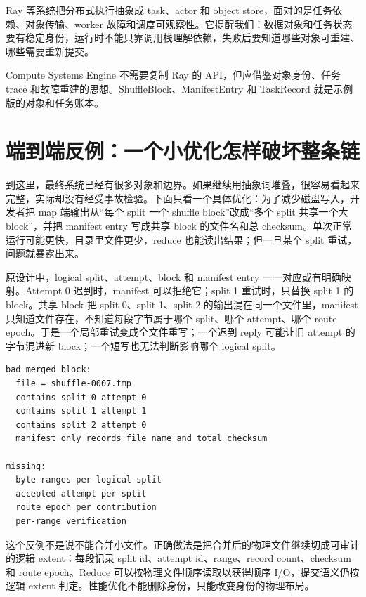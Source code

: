 \begin{casebox}
Ray 等系统把分布式执行抽象成 task、actor 和 object store，面对的是任务依赖、对象传输、worker 故障和调度可观察性。它提醒我们：数据对象和任务状态要有稳定身份，运行时不能只靠调用栈理解依赖，失败后要知道哪些对象可重建、哪些需要重新提交。

Compute Systems Engine 不需要复制 Ray 的 API，但应借鉴对象身份、任务 trace 和故障重建的思想。ShuffleBlock、ManifestEntry 和 TaskRecord 就是示例版的对象和任务账本。
\end{casebox}

\section{端到端反例：一个小优化怎样破坏整条链}

到这里，最终系统已经有很多对象和边界。如果继续用抽象词堆叠，很容易看起来完整，实际却没有经受事故检验。下面只看一个具体优化：为了减少磁盘写入，开发者把 map 端输出从“每个 split 一个 shuffle block”改成“多个 split 共享一个大 block”，并把 manifest entry 写成共享 block 的文件名和总 checksum。单次正常运行可能更快，目录里文件更少，reduce 也能读出结果；但一旦某个 split 重试，问题就暴露出来。

原设计中，logical split、attempt、block 和 manifest entry 一一对应或有明确映射。Attempt 0 迟到时，manifest 可以拒绝它；split 1 重试时，只替换 split 1 的 block。共享 block 把 split 0、split 1、split 2 的输出混在同一个文件里，manifest 只知道文件存在，不知道每段字节属于哪个 split、哪个 attempt、哪个 route epoch。于是一个局部重试变成全文件重写；一个迟到 reply 可能让旧 attempt 的字节混进新 block；一个短写也无法判断影响哪个 logical split。

\begin{lstlisting}[numbers=none,caption={错误优化后的模糊身份}]
bad merged block:
  file = shuffle-0007.tmp
  contains split 0 attempt 0
  contains split 1 attempt 1
  contains split 2 attempt 0
  manifest only records file name and total checksum

missing:
  byte ranges per logical split
  accepted attempt per split
  route epoch per contribution
  per-range verification
\end{lstlisting}

这个反例不是说不能合并小文件。正确做法是把合并后的物理文件继续切成可审计的逻辑 extent：每段记录 split id、attempt id、range、record count、checksum 和 route epoch。Reduce 可以按物理文件顺序读取以获得顺序 I/O，提交语义仍按逻辑 extent 判定。性能优化不能删除身份，只能改变身份的物理布局。

